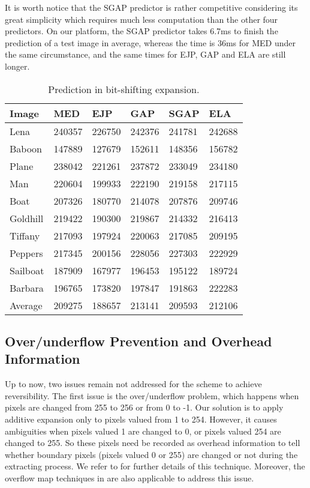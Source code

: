 \documentclass{sig-alternate}
\begin{document}
It is worth notice that the SGAP predictor is rather competitive considering its great simplicity
which requires much less computation than the other four predictors. On our platform, the SGAP
predictor takes 6.7ms to finish the prediction of a test image in average, whereas the time is 36ms
for MED under the same circumstance, and the same times for EJP, GAP and ELA are still longer.

\begin{table}[t]
  \centering
  \caption{\label{tbl:predictors2}Prediction in bit-shifting expansion.}
  \begin{tabular}{llllll}\hline\hline
    Image & MED & EJP & GAP & SGAP & ELA \\\hline
   Lena & 240357 & 226750 & 242376 &241781  & 242688 \\
  Baboon & 147889 & 127679 & 152611 &148356  & 156782 \\
  Plane & 238042 & 221261 & 237872 &233049  & 234180 \\
  Man   & 220604 & 199933 & 222190 &219158  & 217115 \\
  Boat  & 207326 & 180770 & 214078 &207876  & 209746 \\
  Goldhill& 219422 & 190300 & 219867 &214332  & 216413 \\
  Tiffany & 217093 & 197924 & 220063 &217085  & 209195 \\
  Peppers & 217345 & 200156 & 228056 &227303  & 222929 \\
  Sailboat & 187909 & 167977 & 196453 &195122  & 189724 \\
  Barbara & 196765 & 173820 & 197847 &191863  & 222283 \\
  Average & 209275 & 188657 & 213141 &209593  & 212106 \\\hline\hline
  \end{tabular}
\end{table}

\subsection{Over/underflow Prevention and Overhead Information}\label{sub:embed}
Up to now, two issues remain not addressed for the scheme to achieve reversibility. The first issue
is the over/underflow problem, which happens when pixels are changed from 255 to 256 or from 0
to -1. Our solution is to apply additive expansion only to pixels valued from 1 to 254. However, it
causes ambiguities when pixels valued 1 are changed to 0, or pixels valued 254 are changed to 255.
So these pixels need be recorded as overhead information to tell whether boundary pixels (pixels
valued 0 or 255) are changed or not during the extracting process. We refer to \cite{Lin08tp} for
further details of this technique. Moreover, the overflow map techniques in \cite{Thodi07pee,Hu2009}
are also applicable to address this issue.
\end{document}
